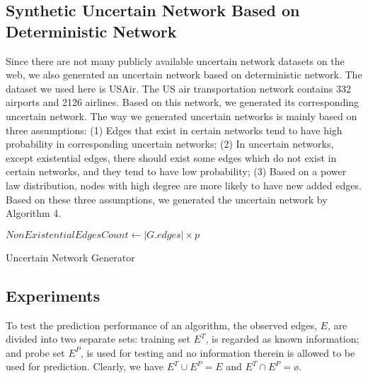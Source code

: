 \documentclass[\main/thesis.tex]{subfiles}
\begin{document}
\subsection*{Synthetic Uncertain Network Based on Deterministic Network}
Since there are not many publicly available uncertain network datasets on the web, we also generated an uncertain network based on deterministic network. The dataset we used here is USAir. The US air transportation network contains 332 airports and 2126 airlines. Based on this network, we generated its corresponding uncertain network. The way we generated uncertain networks is mainly based on three assumptions: (1) Edges that exist in certain networks tend to have high probability in corresponding uncertain networks; (2) In uncertain networks, except existential edges, there should exist some edges which do not exist in certain networks, and they tend to have low probability; (3) Based on a power law distribution, nodes with high degree are more likely to have new added edges. Based on these three assumptions, we generated the uncertain network by Algorithm 4.
\begin{algorithm}
  \For{each edge $e \in G.edges$}{
        Generate probability $P$ according to a Gaussian distribution with mean 0.8 and variance 1. (If not in the range (0,1], regenerate it.)\;
        Assign probability $P$ to edge $e$\;
    }
$NonExistentialEdgesCount\leftarrow|G.edges|\times p$\;
\While{$NonExistentialEdgesCount>0$}{
    Generate edge $e$ which is not in $G.edges$\;
    Generate probability $P$ according to a Gaussian distribution with mean 0.2 and variance 1. (If not in the range (0,1], regenerate it.)\;
    Assign probability $P$ to edge $e$\;
    $NonExistentialEdgesCount \leftarrow NonExistentialEdgesCount-1$\;
}
\caption{Uncertain Network Generator}
\end{algorithm}
\subsection{Experiments}
To test the prediction performance of an algorithm, the observed edges, $E$, are divided into two separate sets: training set $E^T$, is regarded as known information; and probe set $E^P$, is used for testing and no information therein is allowed to be used for prediction. Clearly, we have $E^T \cup E^P = E$ and $E^T \cap E^P = $\o. 
\end{document}
